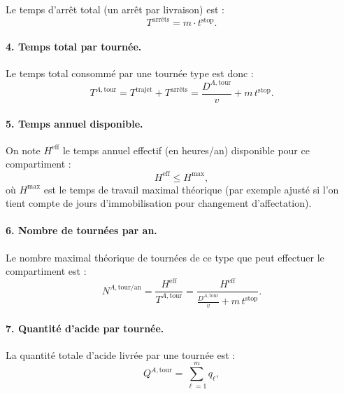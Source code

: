 \documentclass{article}
\begin{document}
Le temps d'arrêt total (un arrêt par livraison) est :
\begin{equation}
  T^{\text{arrêts}} = m \cdot t^{\text{stop}}.
\end{equation}

\paragraph{4. Temps total par tournée.}

Le temps total consommé par une tournée type est donc :
\begin{equation}
  T^{A,\text{tour}}
  =
  T^{\text{trajet}} + T^{\text{arrêts}}
  =
  \frac{D^{A,\text{tour}}}{v} + m \, t^{\text{stop}}.
\end{equation}

\paragraph{5. Temps annuel disponible.}

On note $H^{\text{eff}}$ le temps annuel effectif (en heures/an) disponible pour ce compartiment :
\begin{equation}
  H^{\text{eff}} \le H^{\max},
\end{equation}
où $H^{\max}$ est le temps de travail maximal théorique (par exemple ajusté si l'on tient compte de jours d'immobilisation pour changement d'affectation).

\paragraph{6. Nombre de tournées par an.}

Le nombre maximal théorique de tournées de ce type que peut effectuer le compartiment est :
\begin{equation}
  N^{A,\text{tour/an}}
  =
  \frac{H^{\text{eff}}}{T^{A,\text{tour}}}
  =
  \frac{H^{\text{eff}}}{\frac{D^{A,\text{tour}}}{v} + m \, t^{\text{stop}}}.
\end{equation}

\paragraph{7. Quantité d'acide par tournée.}

La quantité totale d'acide livrée par une tournée est :
\begin{equation}
  Q^{A,\text{tour}} = \sum_{\ell=1}^{m} q_\ell,
\end{equation}
\end{document}
